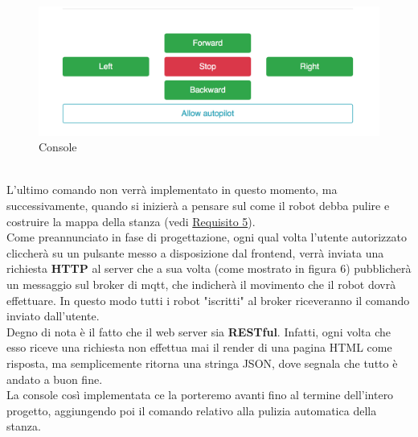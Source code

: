\documentclass{llncs}
\begin{document}
\begin{figure}
    \centering
    \includegraphics[width=0.9\linewidth]{Immagini/Console.png}
    \caption{Console}
    \label{fig:my_label}
\end{figure}
\vspace*{1ex}
\\
L'ultimo comando non verr\`a implementato in questo momento, ma successivamente, quando si inizier\`a  a pensare sul come il robot debba pulire e costruire la mappa della stanza (vedi \hyperref[Requisito5]{Requisito 5}).\\
Come preannunciato in fase di progettazione, ogni qual volta l'utente autorizzato cliccher\`a su un pulsante messo a disposizione dal frontend, verr\`a inviata una richiesta \textbf{HTTP} al server che a sua volta (come mostrato in figura 6) pubblicher\`a un messaggio sul broker di mqtt, che indicher\`a il movimento che il robot dovr\`a effettuare. In questo modo tutti i robot "iscritti" al broker riceveranno il comando inviato dall'utente.\\
Degno di nota \`e il fatto che il web server sia \textbf{RESTful}. Infatti, ogni volta che esso riceve una richiesta non effettua mai il render di una pagina HTML come risposta, ma semplicemente ritorna una stringa JSON, dove segnala che tutto \`e andato a buon fine.\\
La console cos\`i implementata ce la porteremo avanti fino al termine dell'intero progetto, aggiungendo poi il comando relativo alla pulizia automatica della stanza.
\pagebreak

\end{document}
